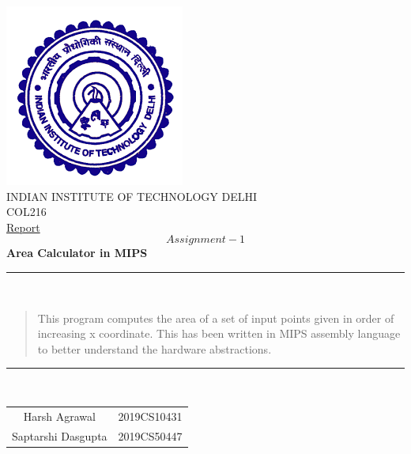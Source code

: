 \documentclass[hidelinks,12pt]{article}
\begin{document}
\begin{titlepage}
    \centering
    \includegraphics[scale=0.5]{./logo.png}\\[1.0cm]
    \Large INDIAN INSTITUTE OF TECHNOLOGY DELHI\\[1.0 cm]
    \LARGE COL216\\[0.1cm]
    \Large \underline{Report}\\
    \large \[Assignment-1\]
    \LARGE \textbf{Area Calculator in MIPS}
    

    \rule{\textwidth}{0.2 mm} \\[0.1cm]
    \begin{abstract}
        This program computes the area of a set of input points given in order of increasing x coordinate.
        This has been written in MIPS assembly language to better understand the hardware abstractions.
                \\[0.1cm]    
    \end{abstract}
    \rule{\textwidth}{0.2 mm} \\[0.1cm]
    \begin{flushright}
        
        \begin{tabular}{c c}
            \small {Harsh Agrawal} & \small {2019CS10431} \\
            \small {Saptarshi Dasgupta} & \small {2019CS50447} \\
        \end{tabular}
    \end{flushright}
\end{titlepage}
\tableofcontents
\newpage
\end{document}
